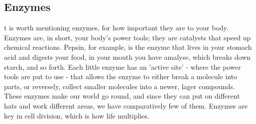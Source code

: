 \subsection*{Enzymes}
t is worth mentioning enzymes, for how important they are to your body. Enzymes are, in short, your body's power tools; they are catalysts that speed up chemical reactions. Pepsin, for example, is the enzyme that lives in your stomach acid and digests your food, in your mouth you have amalyse, which breaks down starch, and so forth. Each little enzyme has an 'active site' - where the power tools are put to use - that allows the enzyme to either break a molecule into parts, or reversely, collect smaller molecules into a newer, lager compounds. These enzymes make our world go round, and since they can put on different hats and work different areas, we have comparatively few of them. Enzymes are key in cell division, which is how life multiplies. 

